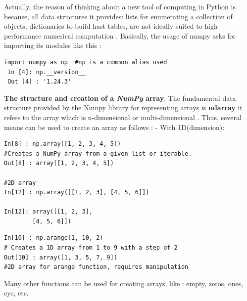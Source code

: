 \documentclass[12pt,a4paper, oneside]{book}
\begin{document}
 Actually, the reason of thinking about a new tool of computing in Python is because, all  data structures it provides: lists for enumerating a collection of objects, dictionaries to build hast tables, are not ideally suited to high-performance numerical computation \citep{van2011numpy}.\newline 
 Basically, the usage of numpy asks for importing its modules like this :  
 \begin{lstlisting}[style=stylejupyter]
 import numpy as np  #np is a common alias used  
 In [4]: np.__version__
 Out [4] : '1.24.3'
 \end{lstlisting} 
 \textbf{The structure and creation of a \textit{NumPy} array}. The fundamental data structure provided by the Numpy library for representing arrays is \textbf{ndarray} it refers to the array which is n-dimensional or multi-dimensional \citep{coursAnalyseDonne2}. Thus, several means can be used to create an array as follows  : \newline
 - With 1D(dimension):
 \begin{lstlisting}[style=stylejupyter]
In[8] : np.array([1, 2, 3, 4, 5])
#Creates a NumPy array from a given list or iterable.
Out[8] : array([1, 2, 3, 4, 5]) 

#2D array
In[12] : np.array([[1, 2, 3], [4, 5, 6]])

In[12]: array([[1, 2, 3],
		[4, 5, 6]])
 \end{lstlisting}
 \begin{lstlisting}[style=stylejupyter]
In[10] : np.arange(1, 10, 2)  
# Creates a 1D array from 1 to 9 with a step of 2
Out[10] : array([1, 3, 5, 7, 9]) 
#2D array for arange function, requires manipulation
 \end{lstlisting} 
  Many other functions can be used for creating arrays, like : empty, zeros, ones, eye, etc. \\
  
\end{document}
